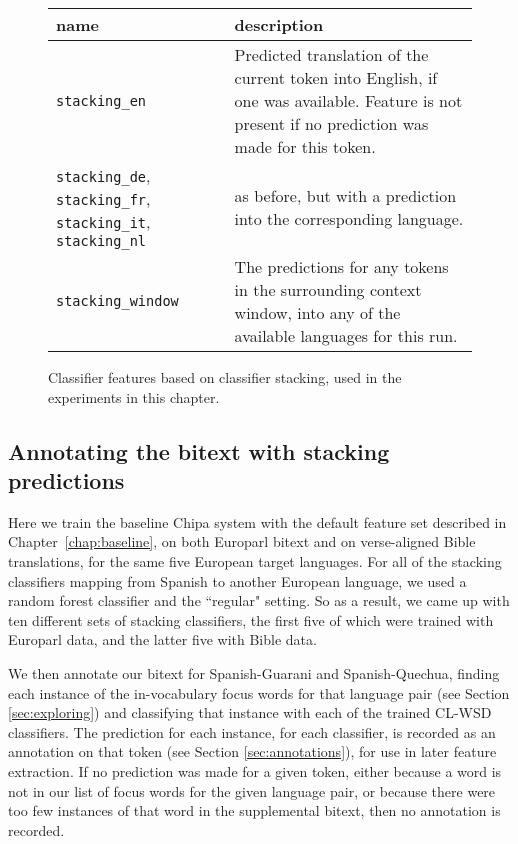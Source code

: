 \begin{figure*}
  \begin{centering}
  \begin{tabular}{|p{3.5cm}|p{11cm}|}
    \hline
    name          & description  \\
    \hline
    \texttt{stacking\_en} & Predicted translation of the current token into
    English, if one was available. Feature is not present if no prediction was
    made for this token. \\
    \hline
    \texttt{stacking\_de}, \texttt{stacking\_fr}, \texttt{stacking\_it},
    \texttt{stacking\_nl} & as before, but with a prediction into the
    corresponding language.\\
    \hline
    \texttt{stacking\_window} & The predictions for any tokens in the
    surrounding context window, into any of the available languages for this
    run. \\
    \hline
  \end{tabular}
  \end{centering}
  \caption{Classifier features based on classifier stacking, used in the
  experiments in this chapter.}
  \label{fig:stackingfeatures}
\end{figure*}

\subsection{Annotating the bitext with stacking predictions}
Here we train the baseline Chipa system with the default feature set described
in Chapter~\ref{chap:baseline}, on both Europarl bitext and on verse-aligned
Bible translations, for the same five European target languages. For all of
the stacking classifiers mapping from Spanish to another European language, we
used a random forest classifier and the ``regular" setting. So as a result, we
came up with ten different sets of stacking classifiers, the first five of
which were trained with Europarl data, and the latter five with Bible data.

We then annotate our bitext for Spanish-Guarani and Spanish-Quechua, finding
each instance of the in-vocabulary focus words for that language pair (see
Section \ref{sec:exploring}) and classifying that instance with each of the
trained CL-WSD classifiers. The prediction for each instance, for each
classifier, is recorded as an annotation on that token (see Section
\ref{sec:annotations}), for use in later feature extraction. If no prediction
was made for a given token, either because a word is not in our list of focus
words for the given language pair, or because there were too few instances of
that word in the supplemental bitext, then no annotation is recorded.

